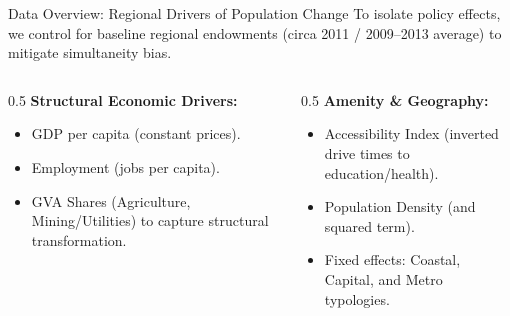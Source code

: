 \documentclass[aspectratio=169]{beamer}
\begin{document}
\begin{frame}{Data Overview: Regional Drivers of Population Change}
    To isolate policy effects, we control for baseline regional endowments (circa 2011 / 2009--2013 average) to mitigate simultaneity bias.
    \vspace{0.3cm}
    \begin{columns}[T]
        \begin{column}{0.5\textwidth}
            \textbf{Structural Economic Drivers:}
            \begin{itemize}
                \item GDP per capita (constant prices).
                \item Employment (jobs per capita).
                \item GVA Shares (Agriculture, Mining/Utilities) to capture structural transformation.
            \end{itemize}
        \end{column}
        \begin{column}{0.5\textwidth}
            \textbf{Amenity \& Geography:}
            \begin{itemize}
                \item Accessibility Index (inverted drive times to education/health).
                \item Population Density (and squared term).
                \item Fixed effects: Coastal, Capital, and Metro typologies.
            \end{itemize}
        \end{column}
    \end{columns}
\end{frame}
\end{document}
